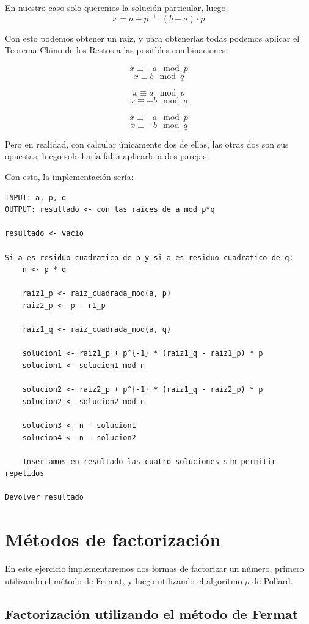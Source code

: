 \documentclass[12pt, spanish]{article}
\begin{document}
En nuestro caso solo queremos la solución particular, luego:
$$x = a + p^{-1} \cdot (b - a) \cdot p$$

Con esto podemos obtener un raiz, y para obtenerlas todas podemos aplicar el Teorema Chino de los Restos a las positbles combinaciones:

$$x \equiv -a \mod p$$
$$x \equiv b \mod q$$

$$x \equiv a \mod p$$
$$x \equiv -b \mod q$$


$$x \equiv -a \mod p$$
$$x \equiv -b \mod q$$

Pero en realidad, con calcular únicamente dos de ellas, las otras dos son sus opuestas, luego solo haría falta aplicarlo a dos parejas.

Con esto, la implementación sería:


\begin{lstlisting}[caption={Algoritmo raices cuadradas mod p*q}]
INPUT: a, p, q
OUTPUT: resultado <- con las raices de a mod p*q

resultado <- vacio

Si a es residuo cuadratico de p y si a es residuo cuadratico de q:
	n <- p * q

	raiz1_p <- raiz_cuadrada_mod(a, p)
	raiz2_p <- p - r1_p

	raiz1_q <- raiz_cuadrada_mod(a, q)

	solucion1 <- raiz1_p + p^{-1} * (raiz1_q - raiz1_p) * p
	solucion1 <- solucion1 mod n

	solucion2 <- raiz2_p + p^{-1} * (raiz1_q - raiz2_p) * p
	solucion2 <- solucion2 mod n

	solucion3 <- n - solucion1
	solucion4 <- n - solucion2

	Insertamos en resultado las cuatro soluciones sin permitir repetidos

Devolver resultado
\end{lstlisting}


\section{Métodos de factorización}

En este ejercicio implementaremos dos formas de factorizar un número, primero utilizando el método de Fermat, y luego utilizando el algoritmo $\rho$ de Pollard.

\subsection{Factorización utilizando el método de Fermat}
\end{document}
